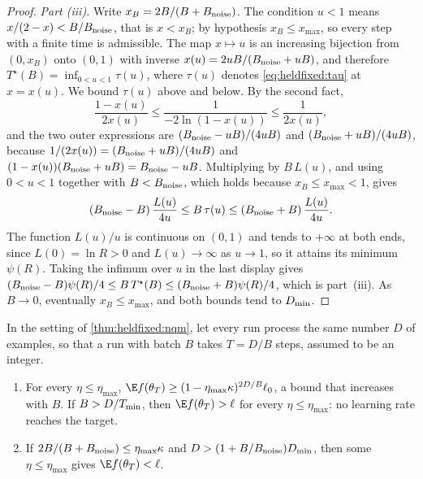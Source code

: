\begin{refsection}
\begin{proof}
\emph{Part (iii).} Write $x_B=2B/(B+B_{\mathrm{noise}})$. The condition $u<1$ means $x/(2-x)<B/B_{\mathrm{noise}}$, that is $x<x_B$; by hypothesis $x_B\le x_{\max}$, so every step with a finite time is admissible. The map $x\mapsto u$ is an increasing bijection from $(0,x_B)$ onto $(0,1)$ with inverse $x(u)=2uB/(B_{\mathrm{noise}}+uB)$, and therefore $T^\star(B)=\inf_{0<u<1}\tau(u)$, where $\tau(u)$ denotes \eqref{eq:heldfixed:tau} at $x=x(u)$. We bound $\tau(u)$ above and below. By the second fact,
\[
\frac{1-x(u)}{2x(u)}\le\frac{1}{-2\ln(1-x(u))}\le\frac{1}{2x(u)} ,
\]
and the two outer expressions are $(B_{\mathrm{noise}}-uB)/(4uB)$ and $(B_{\mathrm{noise}}+uB)/(4uB)$, because $1/(2x(u))=(B_{\mathrm{noise}}+uB)/(4uB)$ and $(1-x(u))(B_{\mathrm{noise}}+uB)=B_{\mathrm{noise}}-uB$. Multiplying by $B\,L(u)$, and using $0<u<1$ together with $B<B_{\mathrm{noise}}$, which holds because $x_B\le x_{\max}<1$, gives
\[
(B_{\mathrm{noise}}-B)\,\frac{L(u)}{4u}\le B\,\tau(u)\le(B_{\mathrm{noise}}+B)\,\frac{L(u)}{4u}.
\]
The function $L(u)/u$ is continuous on $(0,1)$ and tends to $+\infty$ at both ends, since $L(0)=\ln R>0$ and $L(u)\to\infty$ as $u\to1$, so it attains its minimum $\psi(R)$. Taking the infimum over $u$ in the last display gives $(B_{\mathrm{noise}}-B)\psi(R)/4\le B\,T^\star(B)\le(B_{\mathrm{noise}}+B)\psi(R)/4$, which is part~(iii). As $B\to0$, eventually $x_B\le x_{\max}$, and both bounds tend to $D_{\min}$.
\end{proof}

\begin{corollary}\label{cor:heldfixed:epochs}
In the setting of \cref{thm:heldfixed:nqm}, let every run process the same number $D$ of examples, so that a run with batch $B$ takes $T=D/B$ steps, assumed to be an integer.
\begin{enumerate}
\item For every $\eta\le\eta_{\max}$, $\E f(\theta_T)\ge(1-\eta_{\max}\kappa)^{2D/B}\ell_0$, a bound that increases with $B$. If $B>D/T_{\min}$, then $\E f(\theta_T)>\ell$ for every $\eta\le\eta_{\max}$: no learning rate reaches the target.
\item If $2B/(B+B_{\mathrm{noise}})\le\eta_{\max}\kappa$ and $D>(1+B/B_{\mathrm{noise}})D_{\min}$, then some $\eta\le\eta_{\max}$ gives $\E f(\theta_T)<\ell$.
\end{enumerate}
\end{corollary}


\end{refsection}
